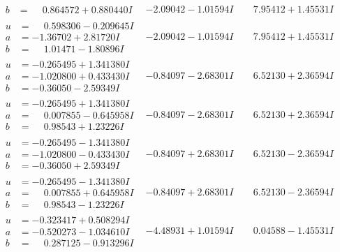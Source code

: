 \documentclass[1p]{elsarticle_modified}
\theoremstyle{definition}
\begin{document}
$$\begin{array}{c|c|c}
\begin{aligned}
b &= \phantom{-}0.864572 + 0.880440 I\end{aligned}
 & -2.09042 - 1.01594 I & \phantom{-}7.95412 + 1.45531 I \\ \hline\begin{aligned}
u &= \phantom{-}0.598306 - 0.209645 I \\
a &= -1.36702 + 2.81720 I \\
b &= \phantom{-}1.01471 - 1.80896 I\end{aligned}
 & -2.09042 - 1.01594 I & \phantom{-}7.95412 + 1.45531 I \\ \hline\begin{aligned}
u &= -0.265495 + 1.341380 I \\
a &= -1.020800 + 0.433430 I \\
b &= -0.36050 - 2.59349 I\end{aligned}
 & -0.84097 - 2.68301 I & \phantom{-}6.52130 + 2.36594 I \\ \hline\begin{aligned}
u &= -0.265495 + 1.341380 I \\
a &= \phantom{-}0.007855 - 0.645958 I \\
b &= \phantom{-}0.98543 + 1.23226 I\end{aligned}
 & -0.84097 - 2.68301 I & \phantom{-}6.52130 + 2.36594 I \\ \hline\begin{aligned}
u &= -0.265495 - 1.341380 I \\
a &= -1.020800 - 0.433430 I \\
b &= -0.36050 + 2.59349 I\end{aligned}
 & -0.84097 + 2.68301 I & \phantom{-}6.52130 - 2.36594 I \\ \hline\begin{aligned}
u &= -0.265495 - 1.341380 I \\
a &= \phantom{-}0.007855 + 0.645958 I \\
b &= \phantom{-}0.98543 - 1.23226 I\end{aligned}
 & -0.84097 + 2.68301 I & \phantom{-}6.52130 - 2.36594 I \\ \hline\begin{aligned}
u &= -0.323417 + 0.508294 I \\
a &= -0.520273 - 1.034610 I \\
b &= \phantom{-}0.287125 - 0.913296 I\end{aligned}
 & -4.48931 + 1.01594 I & \phantom{-}0.04588 - 1.45531 I \\ \hline\begin{aligned}

\end{aligned}
\end{array}$$
\end{document}
